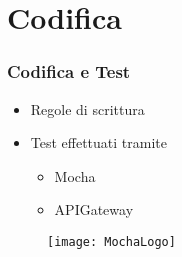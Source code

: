 
\section{Codifica}
\begin{frame}

  \frametitle{Codifica e Test}

  \begin{itemize}
  \item Regole di scrittura
  \item Test effettuati tramite
    \begin{itemize}
    \item Mocha
    \item APIGateway
    \end{itemize}
  \end{itemize}

  \begin{figure}[H]
    \centering
    \texttt{[image: MochaLogo]}
  \end{figure}

  
\end{frame}
